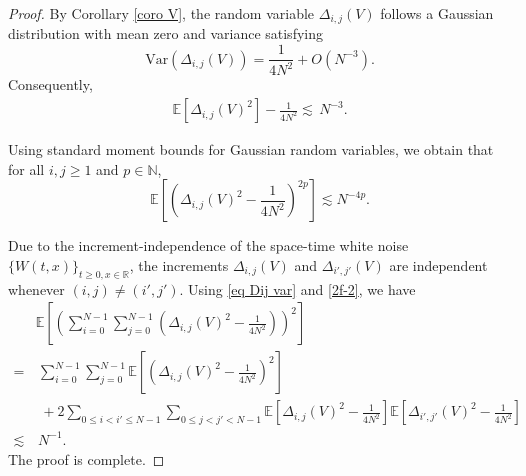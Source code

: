 \documentclass[10pt,a4paper]{amsart}
\begin{document}
 \begin{proof}
By  Corollary \ref{coro V},     the random variable  $ \Delta_{i,j}(V)$  follows  a  Gaussian distribution with mean zero and   variance  satisfying 
$$ \mathrm{Var} \left(\Delta_{i,j}(V)\right)= \frac{1}{4N^2} +O\left(N^{-3}\right).$$ 
Consequently, 
\begin{align}\label{eq Dij var}
\mathbb E\left[\Delta_{i,j}(V)^{2}\right] - \frac{1}{4N^2} \lesssim \,  N^{-3}.
\end{align}

  Using  standard moment bounds for  Gaussian random variables, we obtain that for all $i, j\geq 1$ and $p\in \mathbb N$,	 
	\begin{equation}\label{2f-2}
			\mathbb{E}\left[   \left( \Delta_{i,j}(V)^{2} - \frac{1}{4N^{2}}\right) ^{2p}\right]\lesssim  N^{-4p}.
		\end{equation} 
	
	Due to the  increment-independence  of the space-time white  noise $\{W(t, x)\}_{t\ge0, x\in\mathbb R}$,     	  the increments 
  $\Delta_{i,j}(V) $ and $\Delta_{i',j'}(V) $ are independent whenever  $(i, j)\neq (i', j')$.  Using \eqref{eq Dij var} and \eqref{2f-2},  we  have
       \begin{align*}
&   \mathbb{E}\left[   \left(\sum_{i=0}^{N-1}\sum_{j=0}^{N-1}  \left(     \Delta_{i,j}(V) ^{2} - \frac{1}{4N^2}\right)  \right)^{2}\right]   \\
  = & \,     \sum_{i=0}^{N-1}   \sum_{j=0}^{N-1}   \mathbb{E} \left[  \left(    \Delta_{i,j}(V)  ^{2} - \frac{1}{4N^2}  \right)^{2}\right]\\
  &\,\, + 2 \sum_{0\le i<i'\le N-1}    \sum_{0\le j<j'<N-1}    \mathbb{E} \left[       \Delta_{i,j}(V)^{2} - \frac{1}{4N^2}    \right]   \mathbb{E} \left[   \Delta_{i',j'}(V)^{2} - \frac{1}{4N^2}    \right]\\
\lesssim    &\,   N^{-1}.
    \end{align*} 
        The proof is complete. 
     \end{proof}
\end{document}
